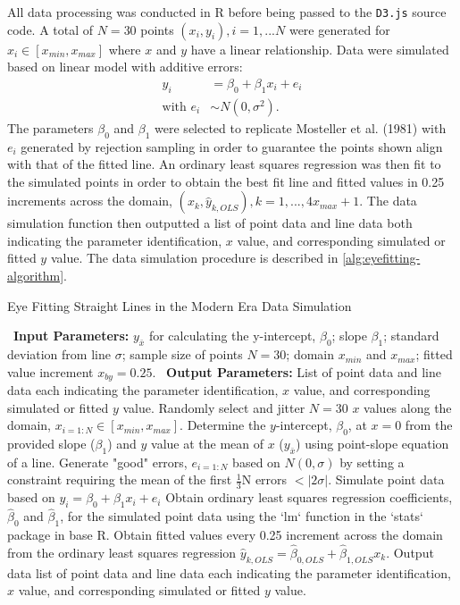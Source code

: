 \documentclass[print]{nuthesis}
\begin{document}
All data processing was conducted in R before being passed to the \texttt{D3.js} source code.
A total of \(N = 30\) points \((x_i, y_i), i = 1,...N\) were generated for \(x_i \in [x_{min}, x_{max}]\) where \(x\) and \(y\) have a linear relationship.
Data were simulated based on linear model with additive errors:
\begin{align}
y_i & = \beta_0 + \beta_1 x_i + e_i \\
\text{with } e_i & \sim N(0, \sigma^2). \nonumber
\end{align}
The parameters \(\beta_0\) and \(\beta_1\) were selected to replicate Mosteller et al. (1981) with \(e_i\) generated by rejection sampling in order to guarantee the points shown align with that of the fitted line.
An ordinary least squares regression was then fit to the simulated points in order to obtain the best fit line and fitted values in 0.25 increments across the domain, \((x_k, \hat y_{k,OLS}), k = 1, ..., 4 x_{max} +1\).
The data simulation function then outputted a list of point data and line data both indicating the parameter identification, \(x\) value, and corresponding simulated or fitted \(y\) value.
The data simulation procedure is described in \cref{alg:eyefitting-algorithm}.

\begin{algorithm}
  \caption{Eye Fitting Straight Lines in the Modern Era Data Simulation}\label{alg:eyefitting-algorithm}
  \begin{algorithmic}[1]
    \Statex \textbullet~\textbf{Input Parameters:} $y_{\bar{x}}$ for calculating the y-intercept, $\beta_0$; slope $\beta_1$; standard deviation from line $\sigma$; sample size of points $N = 30$; domain $x_{min}$ and $x_{max}$; fitted value increment $x_{by} = 0.25$.
    \Statex \textbullet~\textbf{Output Parameters:} List of point data and line data each indicating the parameter identification, $x$ value, and corresponding simulated or fitted $y$ value.
    \State Randomly select and jitter $N = 30$ $x$ values along the domain, $x_{i=1:N}\in [x_{min}, x_{max}]$.
    \State Determine the $y$-intercept, $\beta_0$, at $x = 0$ from the provided slope ($\beta_1$) and $y$ value at the mean of $x$ ($y_{\bar{x}}$) using point-slope equation of a line.
    \State Generate "good" errors, $e_{i = 1:N}$ based on $N(0,\sigma)$ by setting a constraint requiring the mean of the first $\frac{1}{3}\text{N}$ errors $< |2\sigma|.$
    \State Simulate point data based on $y_i = \beta_0 + \beta_1 x_i + e_i$
    \State Obtain ordinary least squares regression coefficients, $\hat\beta_0$ and $\hat\beta_1$, for the simulated point data using the `lm` function in the `stats` package in base R.
    \State Obtain fitted values every 0.25 increment across the domain from the ordinary least squares regression $\hat y_{k,OLS} = \hat\beta_{0,OLS} + \hat\beta_{1,OLS} x_k$.
    \State Output data list of point data and line data each indicating the parameter identification, $x$ value, and corresponding simulated or fitted $y$ value.
  \end{algorithmic}
\end{algorithm}
\end{document}
